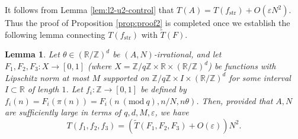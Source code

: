\documentclass[12pt, notitlepage]{amsart}
\numberwithin{equation}{section}
\def\R{\mathbb R}
\def\Z{\mathbb Z}
\def\wt{\widetilde}
\newcommand{\eps}{\varepsilon}
\newcommand{\str}{\operatorname{str}}
\newcommand{\Mod}[1]{\ (\mathrm{mod}\ #1)}
\newtheorem{lemma}[theorem]{Lemma}
\theoremstyle{remark}
\theoremstyle{definition}
\theoremstyle{remark}
\numberwithin{equation}{section}
\begin{document}
It follows from Lemma \ref{lem:l2-u2-control} that $T(A) = T(f_{\str}) + O(\eps N^2)$. Thus the proof of Proposition \ref{prop:proof2} is completed once we establish the following lemma connecting $T(f_{\str})$ with $\wt{T}(F)$.

\begin{lemma}\label{lem:T-Ttilde}
Let $\theta \in (\R/\Z)^d$ be $(A,N)$-irrational, and let $F_1,F_2,F_3: X \rightarrow [0,1]$ (where $X = \Z/q\Z \times \R \times (\R/\Z)^d$)  be functions with Lipschitz norm at most $M$ supported on $\Z/q\Z \times I \times (\R/\Z)^d$ for some interval $I \subset \R$ of length $1$. Let $f_i : \Z\rightarrow [0,1]$ be defined by $f_i(n) = F_i(\pi(n)) = F_i(n\Mod{q}, n/N, n\theta)$. Then, provided that $A,N$ are sufficiently large in terms of $q,d,M,\eps$, we have
\begin{equation}\label{eq:T-Ttilde}
T(f_1,f_2,f_3) = (\wt{T}(F_1,F_2,F_3) + O(\eps))N^2.
\end{equation}
\end{lemma}
\end{document}
